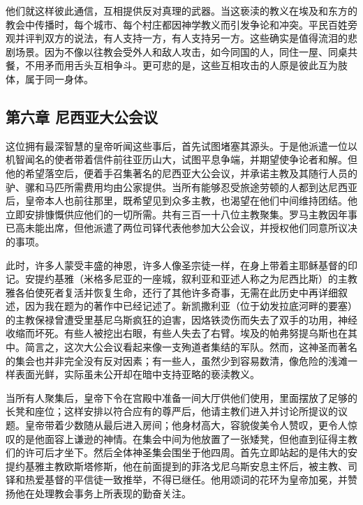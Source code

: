 \par

他们就这样彼此通信，互相提供反对真理的武器。当这亵渎的教义在埃及和东方的教会中传播时，每个城市、每个村庄都因神学教义而引发争论和冲突。平民百姓旁观并评判双方的说法，有人支持一方，有人支持另一方。这些确实是值得流泪的悲剧场景。因为不像以往教会受外人和敌人攻击，如今同国的人，同住一屋、同桌共餐，不用矛而用舌头互相争斗。更可悲的是，这些互相攻击的人原是彼此互为肢体，属于同一身体。\par


\subsection{第六章 尼西亚大公会议}

这位拥有最深智慧的皇帝听闻这些事后，首先试图堵塞其源头。于是他派遣一位以机智闻名的使者带着信件前往亚历山大，试图平息争端，并期望使争论者和解。但他的希望落空后，便着手召集著名的尼西亚大公会议，并承诺主教及其随行人员的驴、骡和马匹所需费用均由公家提供。当所有能够忍受旅途劳顿的人都到达尼西亚后，皇帝本人也前往那里，既希望见到众多主教，也渴望在他们中间维持团结。他立即安排慷慨供应他们的一切所需。共有三百一十八位主教聚集。罗马主教因年事已高未能出席，但他派遣了两位司铎代表他参加大公会议，并授权他们同意所议决的事项。\par

此时，许多人蒙受丰盛的神恩，许多人像圣宗徒一样，在身上带着主耶稣基督的印记。安提约基雅（米格多尼亚的一座城，叙利亚和亚述人称之为尼西比斯）的主教雅各伯使死者复活并恢复生命，还行了其他许多奇事，无需在此历史中再详细叙述，因为我在题为的著作中已经记述了。新凯撒利亚（位于幼发拉底河畔的要塞）的主教保禄曾遭受里基尼乌斯疯狂的迫害，因烙铁烫伤而失去了双手的功用，神经收缩而坏死。有些人被挖出右眼，有些人失去了右臂。埃及的帕弗努提乌斯也在其中。简言之，这次大公会议看起来像一支殉道者集结的军队。然而，这神圣而著名的集会也并非完全没有反对因素；有一些人，虽然少到容易数清，像危险的浅滩一样表面光鲜，实际虽未公开却在暗中支持亚略的亵渎教义。\par

当所有人聚集后，皇帝下令在宫殿中准备一间大厅供他们使用，里面摆放了足够的长凳和座位；这样安排以符合应有的尊严后，他请主教们进入并讨论所提议的议题。皇帝带着少数随从最后进入房间；他身材高大，容貌俊美令人赞叹，更令人惊叹的是他面容上谦逊的神情。在集会中间为他放置了一张矮凳，但他直到征得主教们的许可后才坐下。然后全体神圣集会围坐于他四周。首先立即站起的是伟大的安提约基雅主教欧斯塔修斯，他在前面提到的菲洛戈尼乌斯安息主怀后，被主教、司铎和热爱基督的平信徒一致推举，不得已继任。他用颂词的花环为皇帝加冕，并赞扬他在处理教会事务上所表现的勤奋关注。\par


